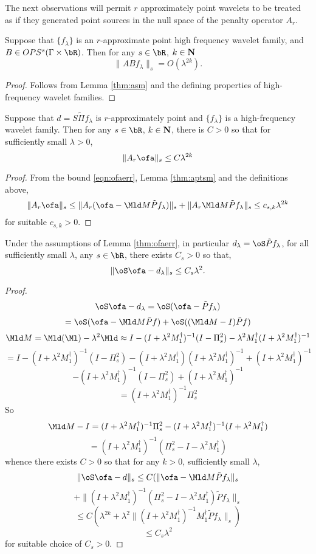 The next observations will permit $r$ approximately point wavelets to be treated as if they generated point sources in the null space of the penalty operator $A_r$.
\begin{lemma}
\label{thm:aptsm}
Suppose that $\{f_{\lambda}\}$ is an $r$-approximate point high frequency wavelet family, and $B \in OPS^{s}(\Gamma \times \bR)$. Then for any $s \in \bR$, $k \in {\bf N}$
\[
\|AB f_{\lambda}\|_s = O(\lambda^{2k}).
\]
\end{lemma}
\begin{proof}
Follows from Lemma \ref{thm:asm} and the defining properties of high-frequency wavelet families.
\end{proof}

\begin{lemma}
\label{thm:ofasm}
Suppose that $d=S\tilde{\Pi}f_{\lambda}$ is $r$-approximately point and $\{f_{\lambda}\}$ is a high-frequency wavelet family. Then for any $s \in \bR$, $k \in {\bf N}$, there is $C>0$ so that for sufficiently small $\lambda>0$,
\[
\|A_r \ofa\|_s \le C\lambda^{2k}
\]
\end{lemma}
\begin{proof}
From the bound \ref{eqn:ofaerr}, Lemma \ref{thm:aptsm} and the definitions above,
\[
\|A_r \ofa \|_s \le \|A_r(\ofa - \Mld M\tilde{P}f_{\lambda})\|_s + \|A_r \Mld M \tilde{P}f_{\lambda}\|_s \le c_{s,k}\lambda^{2k}
\]
for suitable $c_{s,k}>0$.
\end{proof}

\begin{lemma}
\label{thm:dataerr}
Under the assumptions of Lemma \ref{thm:ofaerr}, in particular $d_{\lambda} = \oS\tilde{P}f_{\lambda}$, for all sufficiently small $\lambda$, any $s \in \bR$, there exists $C_s>0$ so that,
\[
\|\oS \ofa - d_{\lambda}\|_s \le C_s \lambda^2.
\]
\end{lemma}
\begin{proof}
\[
\oS\ofa - d_{\lambda} = \oS(\ofa - \tilde{P}f_{\lambda}) 
\]
\begin{equation}
\label{eqn:derr1}
= \oS(\ofa - \Mld M\tilde{P}f) + \oS((\Mld M-I)\tilde{P}f)
\end{equation}
\[
\Mld M = \Mld(\Ml) - \lambda^2 \Mld \approx I - (I+\lambda^2M_1^{\dagger})^{-1}(I-\Pi_s^2) - \lambda^2 M_1^{\dagger}(I+\lambda^2M_1^{\dagger})^{-1}
\]
\[
= I - (I+\lambda^2M_1^{\dagger})^{-1}(I-\Pi_s^2) - (I+\lambda^2 M_1^{\dagger})(I+\lambda^2M_1^{\dagger})^{-1} + (I+\lambda^2M_1^{\dagger})^{-1}
\]
\[
-(I+\lambda^2M_1^{\dagger})^{-1}(I-\Pi_s^2)+ (I+\lambda^2M_1^{\dagger})^{-1}
\]
\[
= (I+\lambda^2M_1^{\dagger})^{-1}\Pi_s^2
\]
So
\[
\Mld M - I =(I+\lambda^2M_1^{\dagger})^{-1}\Pi_s^2 - (I+\lambda^2M_1^{\dagger})^{-1}(I+\lambda^2M_1^{\dagger})
\]
\[
=
(I+\lambda^2M_1^{\dagger})^{-1}(\Pi_s^2-I -\lambda^2M_1^{\dagger})
\]
whence there exists $C>0$ so that for any $k>0$, sufficiently small $\lambda$,
\[
\|\oS\ofa - d\|_s  \le C (\|\ofa - \Mld M\tilde{P}f_{\lambda}\|_s 
\]
\[
+ \|(I+\lambda^2M_1^{\dagger})^{-1}(\Pi_s^2-I -\lambda^2M_1^{\dagger})\tilde{P}f_{\lambda}\|_s
\]
\[
\le C(\lambda^{2k} + \lambda^2\|(I+\lambda^2M_1^{\dagger})^{-1}M_1^{\dagger}\tilde{P}f_{\lambda}\|_s)
\]
\[
\le C_s\lambda^2
\]
for suitable choice of $C_s > 0$.
\end{proof}


